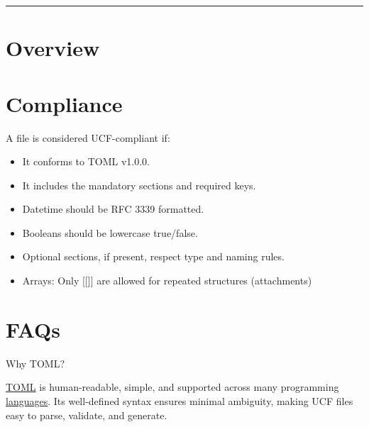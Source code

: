 \documentclass[12pt]{spec}
\begin{document}
\specheader
\bigskip
\hrule


\section{Overview}









\section{Compliance}

A file is considered UCF-compliant if:

\begin{itemize}
  \item It conforms to TOML v1.0.0.
  \item It includes the mandatory sections and required keys.
  \item Datetime should be RFC 3339 formatted.
  \item Booleans should be lowercase true/false.
  \item Optional sections, if present, respect type and naming rules.
  \item Arrays: Only [[]] are allowed for repeated structures (attachments)
\end{itemize}

\section{FAQs}
\begin{specpara}{Why TOML?}

\href{https://toml.io/en}{TOML} is human-readable, simple, and supported across many
programming \href{https://github.com/toml-lang/toml/wiki}{languages}. Its 
well-defined syntax ensures minimal ambiguity, making UCF files easy to parse, 
validate, and generate.

\end{specpara}
\end{document}
